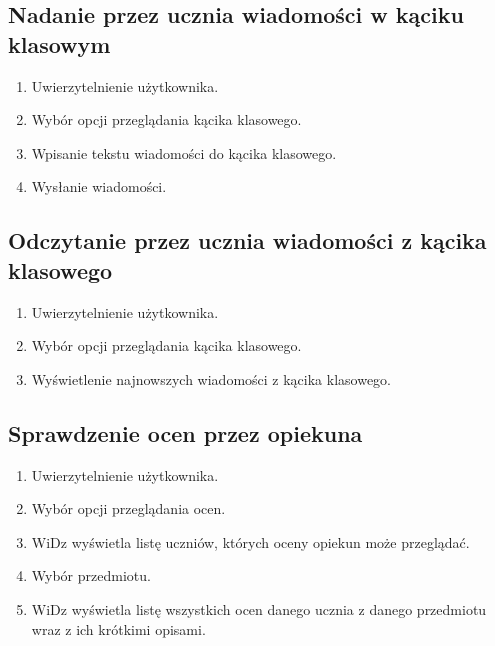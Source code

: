 \documentclass[12pt,leqno,twoside]{mwart}
\begin{document}
\subsection{Nadanie przez ucznia wiadomości w kąciku klasowym}
\begin{enumerate}
\item Uwierzytelnienie użytkownika.
\item Wybór opcji przeglądania kącika klasowego.
\item Wpisanie tekstu wiadomości do kącika klasowego.
\item Wysłanie wiadomości.
\end{enumerate}
\subsection{Odczytanie przez ucznia wiadomości z kącika klasowego}
\begin{enumerate}
\item Uwierzytelnienie użytkownika.
\item Wybór opcji przeglądania kącika klasowego.
\item Wyświetlenie najnowszych wiadomości z kącika klasowego.
\end{enumerate}
\subsection{Sprawdzenie ocen przez opiekuna}
\begin{enumerate}
\item Uwierzytelnienie użytkownika.
\item Wybór opcji przeglądania ocen.
\item WiDz wyświetla listę uczniów, których oceny opiekun może przeglądać.
\item Wybór przedmiotu.
\item WiDz wyświetla listę wszystkich ocen danego ucznia z danego przedmiotu wraz z ich krótkimi opisami.
\end{enumerate}
\end{document}
